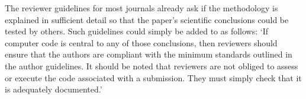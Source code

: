 The reviewer guidelines for most journals already ask if the methodology is explained in sufficient detail so that the paper's scientific conclusions could be tested by others. Such guidelines could simply be added to as follows: `If computer code is central to any of those conclusions, then reviewers should ensure that the authors are compliant with the minimum standards outlined in the author guidelines. It should be noted that reviewers are not obliged to assess or execute the code associated with a submission. They must simply check that it is adequately documented.'   
  
 
    
  
  
  
  
  
  
  
  
  
  
  
  
  
  
  
  
  
  
  
  
  
  